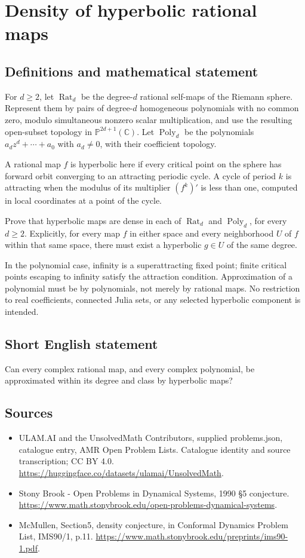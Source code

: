 \documentclass[11pt,a4paper]{article}
\begin{document}
\section*{Density of hyperbolic rational maps}\label{statement}

\subsection{Definitions and mathematical statement}
For $d\ge2$, let $\operatorname{Rat}_d$
be the degree-$d$ rational self-maps of
the Riemann sphere. Represent them by
pairs of degree-$d$ homogeneous polynomials
with no common zero, modulo simultaneous
nonzero scalar multiplication, and use
the resulting open-subset topology in
$\mathbb P^{2d+1}(\mathbb C)$. Let
$\operatorname{Poly}_d$ be the polynomials
$a_dz^d+\cdots+a_0$ with $a_d\ne0$,
with their coefficient topology.

A rational map $f$ is hyperbolic here
if every critical point on the sphere
has forward orbit converging to an
attracting periodic cycle. A cycle of
period $k$ is attracting when the
modulus of its multiplier $(f^k)'$
is less than one, computed in local
coordinates at a point of the cycle.

Prove that hyperbolic maps are dense
in each of $\operatorname{Rat}_d$ and
$\operatorname{Poly}_d$, for every $d\ge2$.
Explicitly, for every map $f$ in
either space and every neighborhood
$U$ of $f$ within that same space,
there must exist a hyperbolic $g\in U$
of the same degree.

In the polynomial case, infinity
is a superattracting fixed point;
finite critical points escaping to
infinity satisfy the attraction
condition. Approximation of a polynomial
must be by polynomials, not merely
by rational maps. No restriction
to real coefficients, connected
Julia sets, or any selected
hyperbolic component is intended.
\subsection{Short English statement}
Can every complex rational map, and every complex polynomial, be approximated within its degree and class by hyperbolic maps?
\subsection{Sources}
\begin{itemize}
\item[S1] ULAM.AI and the UnsolvedMath Contributors, supplied problems.json, catalogue entry, AMR Open Problem Lists. Catalogue identity and source transcription; CC BY 4.0.
\url{https://huggingface.co/datasets/ulamai/UnsolvedMath}.
\item[S2] Stony Brook - Open Problems in Dynamical Systems, 1990 §5 conjecture. 
\url{https://www.math.stonybrook.edu/open-problems-dynamical-systems}.
\item[S3] McMullen, Section5, density conjecture, in Conformal Dynamics Problem List, IMS90/1, p.11.
\url{https://www.math.stonybrook.edu/preprints/ims90-1.pdf}.
\end{itemize}
\end{document}
